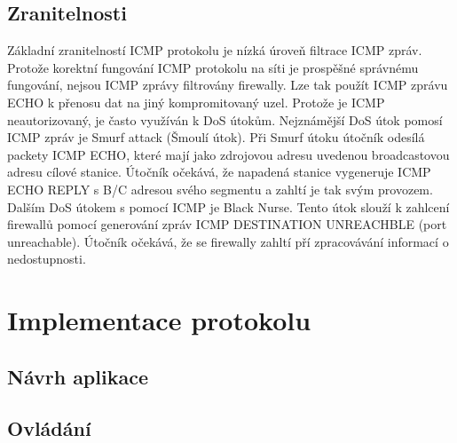 \documentclass[12pt, a4paper]{article}
\begin{document}
\subsection{Zranitelnosti}

Základní zranitelností ICMP protokolu je nízká úroveň filtrace ICMP zpráv. Protože korektní fungování ICMP protokolu na síti je prospěšné správnému fungování, nejsou ICMP zprávy filtrovány firewally. Lze tak použít ICMP zprávu ECHO k přenosu dat na jiný kompromitovaný uzel. Protože je ICMP neautorizovaný, je často využíván k DoS útokům. 
Nejznámější DoS útok pomosí ICMP zpráv je Smurf attack (Šmoulí útok). Při Smurf útoku útočník odesílá packety ICMP ECHO, které mají jako zdrojovou adresu uvedenou broadcastovou adresu cílové stanice. Útočník očekává, že napadená stanice vygeneruje ICMP ECHO REPLY s B/C adresou svého segmentu a zahltí je tak svým provozem.
Dalším DoS útokem s pomocí ICMP je Black Nurse. Tento útok slouží k zahlcení firewallů pomocí generování zpráv ICMP DESTINATION UNREACHBLE (port unreachable). Útočník očekává, že se firewally zahltí pří zpracovávání informací o nedostupnosti.

\section{Implementace protokolu}

\subsection{Návrh aplikace}

\subsection{Ovládání}
\end{document}
